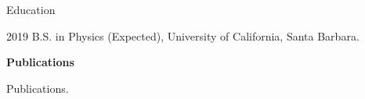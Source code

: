 \begin{vitae}

\begin{vitaesection}{Education}
\vspace{-0.1cm}
\item [2019]	B.S. in Physics (Expected), University of California, Santa Barbara.
\end{vitaesection}

\textbf{Publications}

Publications.

\end{vitae}